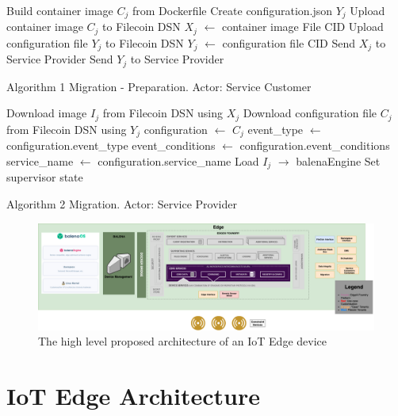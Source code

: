\begin{algorithm}
Build container image $C_j$ from Dockerfile\;
Create configuration.json  $Y_j$ \;
Upload container image $C_j$ to Filecoin DSN\;
   $X_j$  $\leftarrow$ container image File CID \;
Upload configuration file $Y_j$ to Filecoin DSN\;
   $Y_j$ $\leftarrow$ configuration file CID \;
Send $X_j$ to Service Provider\;
Send $Y_j$ to Service Provider\;
\caption{Algorithm  1 Migration - Preparation. Actor: Service Customer}
\label{alg:algorithm1}
\end{algorithm}

\begin{algorithm}

Download image $I_j$ from Filecoin DSN using $X_j$ \;
Download configuration file $C_j$  from Filecoin DSN using $Y_j$ \;
configuration $\leftarrow$ $C_j$ \;
event\_type $\leftarrow$ configuration.event\_type  \;
event\_conditions $\leftarrow$ configuration.event\_conditions \;
service\_name $\leftarrow$ configuration.service\_name \;
Load $I_j$ $\rightarrow$  balenaEngine \;
Set supervisor state \;
\caption{Algorithm 2 Migration. Actor: Service Provider}
\label{alg:algorithm2}
\end{algorithm}
\clearpage

\begin{figure}
    \centering
    \includegraphics[width=1\textwidth]{images/EdgeArch_v7.png}
    \caption{The high level proposed architecture of an IoT Edge device}
    \label{fig:edge}
\end{figure}

\section{IoT Edge Architecture}

